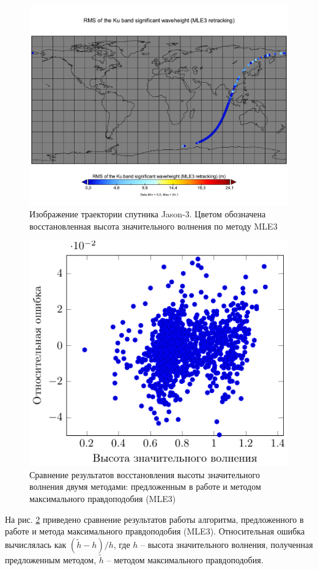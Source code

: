 \begin{figure}[H]
    \centering 
    \includegraphics[width=\linewidth]{img/swh_rms_ku_mle3}
    \caption{Изображение траектории спутника Jason-3. Цветом
    обозначена восстановленная высота значительного волнения по методу MLE3}
    \label{fig:mle3}
\end{figure}
\begin{figure}[H]
    \centering
    \includegraphics[width=0.6\linewidth]{fig/retracking/compare}
    \caption{Сравнение результатов восстановления высоты значительного волнения
    двумя методами: предложенным в работе и методом максимального правдоподобия
(MLE3)}
    \label{fig:mle3_compare}
\end{figure}

На рис. \ref{fig:mle3_compare} приведено сравнение результатов работы
алгоритма, предложенного в работе  и метода максимального правдоподобия (MLE3).
Относительная ошибка вычислялась как $(\tilde h - h) /h$, где  $h$ --
высота значительного волнения, полученная предложенным методом,  $\tilde h$ --
методом максимального правдоподобия.

